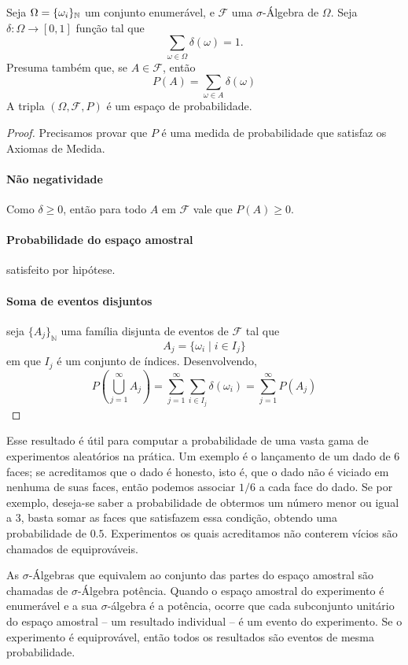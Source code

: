 \begin{thm:soma prob}
\label{thm:soma prob}
Seja $\Omega = \{\omega_i\}_{\mathbb{N}}$ um conjunto enumerável, e $\mathcal{F}$ uma
$\sigma$-Álgebra de $\Omega$.
Seja $\delta: \Omega \to [0, 1]$ função tal que
\[
	\sum_{\omega \in \Omega} \delta(\omega) = 1.
\]
Presuma também que, se $A \in \mathcal{F}$, então
\[
	P(A) = \sum_{\omega \in A} \delta(\omega)
\]
A tripla $(\Omega, \mathcal{F}, P)$ é um espaço de probabilidade.
\begin{proof}
	Precisamos provar que $P$ é uma medida de probabilidade que satisfaz os Axiomas de
	Medida.

	\paragraph{Não negatividade} Como $\delta \ge 0$, então para todo $A$ em $\mathcal{F}$
	vale que $P(A) \geq 0$.

	\paragraph{Probabilidade do espaço amostral} satisfeito por hipótese.

	\paragraph{Soma de eventos disjuntos} seja $\{A_j\}_{\mathbb{N}}$ uma família
	disjunta de eventos de $\mathcal{F}$ tal que
	\[
		A_j = \{\omega_i \mid i \in I_j\}
	\]
	em que $I_j$ é um conjunto de índices. Desenvolvendo,
	\[
		P\left(\bigcup_{j=1}^\infty A_j\right) = \sum_{j=1}^\infty \sum_{i \in I_j} \delta(\omega_i)
		= \sum_{j=1}^\infty P(A_j)
	\]
\end{proof}
\end{thm:soma prob}

Esse resultado é útil para computar a probabilidade de uma vasta gama de
experimentos aleatórios na prática. Um exemplo é o lançamento de um dado de 6
faces; se acreditamos que o dado é honesto, isto é, que o dado não é viciado em
nenhuma de suas faces, então podemos associar $1/6$ a cada face do dado. Se por
exemplo, deseja-se saber a probabilidade de obtermos um número menor ou igual a
3, basta somar as faces que satisfazem essa condição, obtendo uma probabilidade
de $0.5$.
Experimentos os quais acreditamos não conterem vícios são chamados de equiprováveis.

As $\sigma$-Álgebras que equivalem ao conjunto das partes do espaço amostral são
chamadas de $\sigma$-Álgebra potência.
Quando o espaço amostral do experimento é enumerável e a sua $\sigma$-álgebra é a potência,
ocorre que cada subconjunto unitário do espaço amostral -- um resultado individual -- é um
evento do experimento.
Se o experimento é equiprovável, então todos os resultados são eventos de mesma probabilidade.

